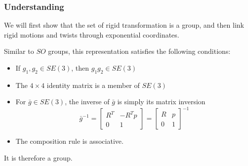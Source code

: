 \documentclass[letterpaper]{article}
\begin{document}
\subsubsection{Understanding}
We will first show that the set of rigid transformation is a group, and then link 
rigid motions and twists through exponential coordinates. 

Similar to $SO$ groups, this representation satisfies the following conditions:
\begin{itemize}
  \setlength\itemsep{0pt}
  \item If $g_1, g_2 \in SE(3)$, then $g_1g_2 \in SE(3)$
  \item The $4\times 4$ identity matrix is a member of $SE(3)$
  \item For $\bar{g} \in SE(3)$, the inverse of $\bar{g}$ is simply its matrix inversion
    \begin{equation*}
      \bar{g}^{-1} = \begin{bmatrix}
        R^{T} & -R^Tp\\0 & 1
      \end{bmatrix} = 
        \begin{bmatrix}
          R & p \\ 0 & 1
        \end{bmatrix}^{-1}
    \end{equation*}
  \item The composition rule is associative.
\end{itemize}
It is therefore a group.
\end{document}
